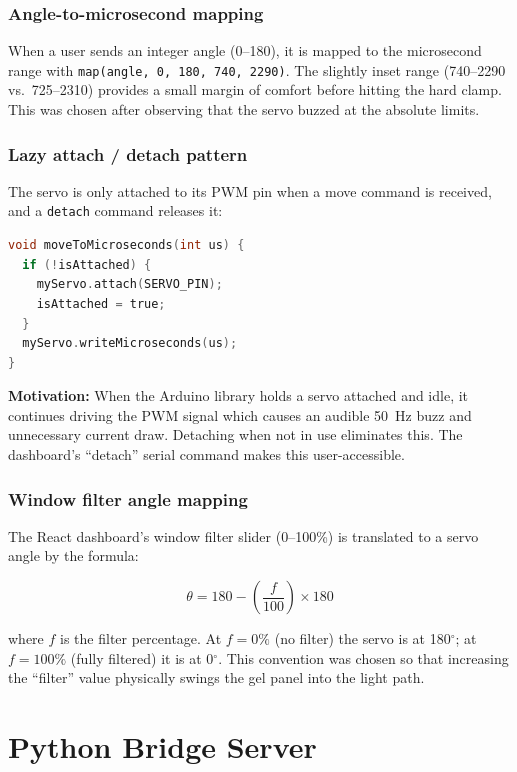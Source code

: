 \documentclass[12pt,letterpaper]{article}
\begin{document}
\subsubsection{Angle-to-microsecond mapping}

When a user sends an integer angle (0–180), it is mapped to the microsecond
range with \texttt{map(angle, 0, 180, 740, 2290)}. The slightly inset range
(740–2290 vs.\ 725–2310) provides a small margin of comfort before hitting the
hard clamp. This was chosen after observing that the servo buzzed at the
absolute limits.

\subsubsection{Lazy attach / detach pattern}

The servo is only attached to its PWM pin when a move command is received, and
a \texttt{detach} command releases it:

\begin{lstlisting}[language=C, caption={Lazy attach pattern}]
void moveToMicroseconds(int us) {
  if (!isAttached) {
    myServo.attach(SERVO_PIN);
    isAttached = true;
  }
  myServo.writeMicroseconds(us);
}
\end{lstlisting}

\textbf{Motivation:} When the Arduino library holds a servo attached and idle,
it continues driving the PWM signal which causes an audible 50~Hz buzz and
unnecessary current draw. Detaching when not in use eliminates this. The
dashboard's ``detach'' serial command makes this user-accessible.

\subsubsection{Window filter angle mapping}

The React dashboard's window filter slider (0–100\%) is translated to a servo
angle by the formula:

\[
  \theta = 180 - \left(\frac{f}{100}\right) \times 180
\]

where $f$ is the filter percentage. At $f = 0\%$ (no filter) the servo is at
180$^\circ$; at $f = 100\%$ (fully filtered) it is at 0$^\circ$. This
convention was chosen so that increasing the ``filter'' value physically swings
the gel panel into the light path.

\section{Python Bridge Server}
\end{document}
